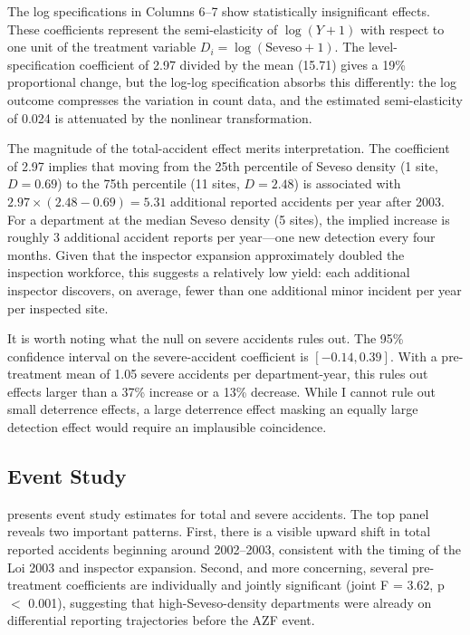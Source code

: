 \documentclass[12pt]{article}
\begin{document}
The log specifications in Columns 6--7 show statistically insignificant effects. These coefficients represent the semi-elasticity of $\log(Y+1)$ with respect to one unit of the treatment variable $D_i = \log(\text{Seveso}+1)$. The level-specification coefficient of 2.97 divided by the mean (15.71) gives a 19\% proportional change, but the log-log specification absorbs this differently: the log outcome compresses the variation in count data, and the estimated semi-elasticity of 0.024 is attenuated by the nonlinear transformation.

The magnitude of the total-accident effect merits interpretation. The coefficient of 2.97 implies that moving from the 25th percentile of Seveso density (1 site, $D = 0.69$) to the 75th percentile (11 sites, $D = 2.48$) is associated with $2.97 \times (2.48 - 0.69) = 5.31$ additional reported accidents per year after 2003. For a department at the median Seveso density (5 sites), the implied increase is roughly 3 additional accident reports per year---one new detection every four months. Given that the inspector expansion approximately doubled the inspection workforce, this suggests a relatively low yield: each additional inspector discovers, on average, fewer than one additional minor incident per year per inspected site.

It is worth noting what the null on severe accidents rules out. The 95\% confidence interval on the severe-accident coefficient is $[-0.14, 0.39]$. With a pre-treatment mean of 1.05 severe accidents per department-year, this rules out effects larger than a 37\% increase or a 13\% decrease. While I cannot rule out small deterrence effects, a large deterrence effect masking an equally large detection effect would require an implausible coincidence.

\subsection{Event Study}

 presents event study estimates for total and severe accidents. The top panel reveals two important patterns. First, there is a visible upward shift in total reported accidents beginning around 2002--2003, consistent with the timing of the Loi 2003 and inspector expansion. Second, and more concerning, several pre-treatment coefficients are individually and jointly significant (joint F = 3.62, p $<$ 0.001), suggesting that high-Seveso-density departments were already on differential reporting trajectories before the AZF event.
\end{document}
